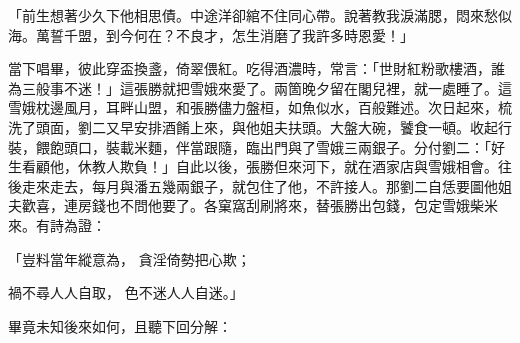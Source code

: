 \begin{showcontents}{}
「前生想著少久下他相思債。中途洋卻綰不住同心帶。說著教我淚滿腮，悶來愁似海。萬誓千盟，到今何在？不良才，怎生消磨了我許多時恩愛！」

當下唱畢，彼此穿盃換盞，倚翠偎紅。吃得酒濃時，常言：「世財紅粉歌樓酒，誰為三般事不迷！」這張勝就把雪娥來愛了。兩箇晚夕留在閣兒裡，就一處睡了。這雪娥枕邊風月，耳畔山盟，和張勝儘力盤桓，如魚似水，百般難述。次日起來，梳洗了頭面，劉二又早安排酒餚上來，與他姐夫扶頭。大盤大碗，饕食一頓。收起行裝，餵飽頭口，裝載米麵，伴當跟隨，臨出門與了雪娥三兩銀子。分付劉二：「好生看顧他，休教人欺負！」自此以後，張勝但來河下，就在酒家店與雪娥相會。往後走來走去，每月與潘五幾兩銀子，就包住了他，不許接人。那劉二自恁要圖他姐夫歡喜，連房錢也不問他要了。各窠窩刮刷將來，替張勝出包錢，包定雪娥柴米來。有詩為證：

「豈料當年縱意為，  貪淫倚勢把心欺；

禍不尋人人自取，  色不迷人人自迷。」

畢竟未知後來如何，且聽下回分解：





\end{showcontents}


